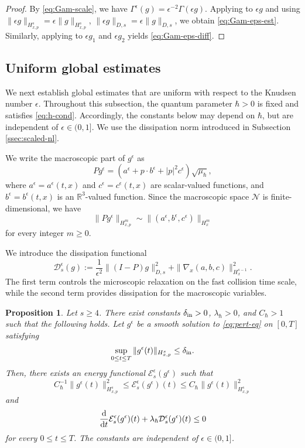 \documentclass[10pt,reqno]{amsart}
\numberwithin{equation}{section}
\newtheorem{proposition}{Proposition}[section]
\newcommand{\lt}{\left}
\newcommand{\rt}{\right}
\newcommand{\R}{\mathbb R}
\newcommand{\calD}{\mathcal D}
\newcommand{\calE}{\mathcal E}
\newcommand{\calN}{\mathcal N}
\newcommand{\rdt}{\textnormal{d}t}
\begin{document}
\begin{proof}
By \eqref{eq:Gam-scale}, we have $\Gamma^\epsilon(g)=\epsilon^{-2}\Gamma(\epsilon g)$. Applying \cite[Lemma 4.3]{CHHpre} to $\epsilon g$ and using $\|\epsilon g\|_{H^s_{x,p}}=\epsilon\|g\|_{H^s_{x,p}}$, $\|\epsilon g\|_{D,s}=\epsilon\|g\|_{D,s}$, we obtain \eqref{eq:Gam-eps-est}. Similarly, applying \cite[Lemma 4.6]{CHHpre} to $\epsilon g_1$ and $\epsilon g_2$ yields \eqref{eq:Gam-eps-diff}.
\end{proof}
%
%
%
%
%
%
%
%
%
%
\subsection{Uniform global estimates} 

We next establish global estimates that are uniform with respect to the Knudsen number $\epsilon$. Throughout this subsection, the quantum parameter $\hbar>0$ is fixed and satisfies \eqref{eq:h-cond}. Accordingly, the constants below may depend on $\hbar$, but are independent of $\epsilon\in(0,1]$. We use the dissipation norm introduced in Subsection \ref{ssec:scaled-nl}.

We write the macroscopic part of $g^\epsilon$ as
\[
P g^\epsilon=\lt(a^\epsilon+p\cdot b^\epsilon+|p|^2c^\epsilon\rt)\sqrt{\mu_\hbar},
\]
where $a^\epsilon=a^\epsilon(t,x)$ and $c^\epsilon=c^\epsilon(t,x)$ are scalar-valued functions, and $b^\epsilon=b^\epsilon(t,x)$ is an $\R^3$-valued function. Since the macroscopic space $\calN$ is finite-dimensional, we have
\[
\|P g^\epsilon\|_{H^m_{x,p}}\sim\|(a^\epsilon,b^\epsilon,c^\epsilon)\|_{H^m_x}
\]
for every integer $m\ge0$.

We introduce the dissipation functional
\[
\calD^\epsilon_s(g):=\frac{1}{\epsilon^2}\|(I-P)g\|_{D,s}^2+\|\nabla_x(a,b,c)\|_{H^{s-1}_x}^2.
\]
The first term controls the microscopic relaxation on the fast collision time scale, while the second term provides dissipation for the macroscopic variables.

\begin{proposition}\label{prop:unif-est}
Let $s\ge4$. There exist constants $\delta_{\rm in}>0$, $\lambda_\hbar>0$, and $C_\hbar>1$ such that the following holds. Let $g^\epsilon$ be a smooth solution to \eqref{eq:pert-eq} on $[0,T]$ satisfying
\[
\sup_{0\le t\le T}\|g^\epsilon(t)\|_{H^s_{x,p}}\le\delta_{\rm in}.
\]
Then, there exists an energy functional $\calE^\epsilon_s(g^\epsilon)$ such that
\[
C_\hbar^{-1}\|g^\epsilon(t)\|_{H^s_{x,p}}^2\le\calE^\epsilon_s(g^\epsilon)(t)\le C_\hbar\|g^\epsilon(t)\|_{H^s_{x,p}}^2
\]
and
\[
\frac{\rm d}{\rdt}\calE^\epsilon_s(g^\epsilon)(t)+\lambda_\hbar\calD^\epsilon_s(g^\epsilon)(t)\le0
\]
for every $0\le t\le T$. The constants are independent of $\epsilon\in(0,1]$.
\end{proposition}
\end{document}
